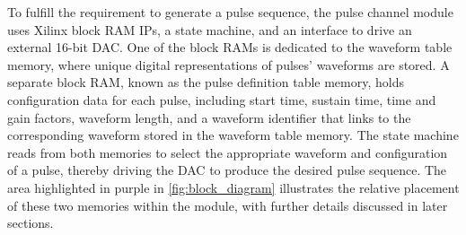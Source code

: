 



To fulfill the requirement to generate a pulse sequence, the pulse channel module uses Xilinx block RAM IPs, a state machine, and an interface to drive an external 16-bit DAC. One of the block RAMs is dedicated to the waveform table memory, where unique digital representations of pulses' waveforms are stored. A separate block RAM, known as the pulse definition table memory, holds configuration data for each pulse, including start time, sustain time, time and gain factors, waveform length, and a waveform identifier that links to the corresponding waveform stored in the waveform table memory. The state machine reads from both memories to select the appropriate waveform and configuration of a pulse, thereby driving the DAC to produce the desired pulse sequence. The area highlighted in purple in \autoref{fig:block_diagram} illustrates the relative placement of these two memories within the module, with further details discussed in later sections.

